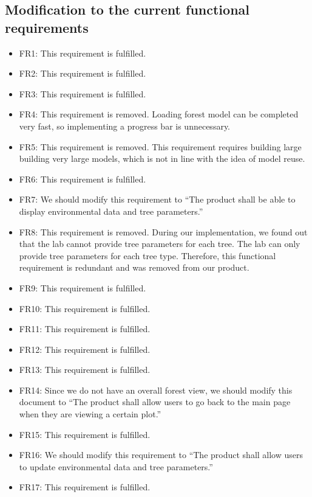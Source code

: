 \documentclass[12pt, titlepage]{article}
\begin{document}
\subsection{Modification to the current functional requirements}
\begin{itemize}
\item FR1: This requirement is fulfilled.
\item FR2: This requirement is fulfilled.
\item FR3: This requirement is fulfilled.
\item FR4: This requirement is removed. Loading forest model can be completed very
fast, so implementing a progress bar is unnecessary.
\item FR5: This requirement is removed. This requirement requires building large 
building very large models, which is not in line with the idea of model reuse.
\item FR6: This requirement is fulfilled.
\item FR7: We should modify this requirement to ``The product shall be able 
to display environmental data and tree parameters.''
\item FR8: This requirement is removed. During our implementation, we found out that
the lab cannot provide tree parameters for each tree. The lab can only provide tree
parameters for each tree type. Therefore, this functional requirement is redundant 
and was removed from our product.
\item FR9: This requirement is fulfilled.
\item FR10: This requirement is fulfilled.
\item FR11: This requirement is fulfilled.
\item FR12: This requirement is fulfilled.
\item FR13: This requirement is fulfilled.
\item FR14: Since we do not have an overall forest view, we should modify this 
document to ``The product shall allow users to go back to the main page when 
they are viewing a certain plot.''
\item FR15: This requirement is fulfilled.
\item FR16: We should modify this requirement to ``The product shall allow users to
update environmental data and tree parameters.''
\item FR17: This requirement is fulfilled.
\end{itemize}
\end{document}
